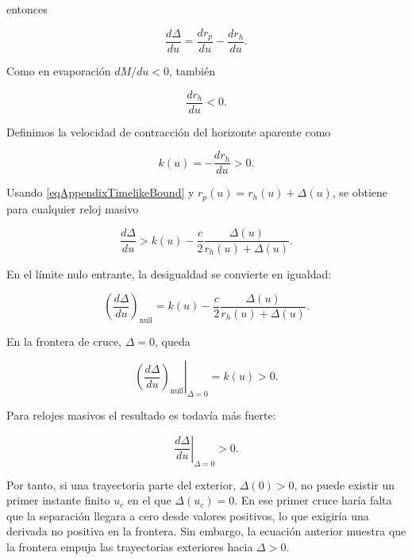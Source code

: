 \documentclass[
aps,
prd,
reprint,
superscriptaddress,
nofootinbib,
amsmath,
amssymb
]{revtex4-2}
\begin{document}
entonces

\begin{equation}
\frac{d\Delta}{du}
=
\frac{dr_p}{du}
-
\frac{dr_h}{du}.
\end{equation}

Como en evaporación $dM/du<0$, también

\begin{equation}
\frac{dr_h}{du}<0.
\end{equation}

Definimos la velocidad de contracción del horizonte aparente como

\begin{equation}
k(u)=
-
\frac{dr_h}{du}
>0.
\end{equation}

Usando \eqref{eqAppendixTimelikeBound} y $r_p(u)=r_h(u)+\Delta(u)$, se obtiene para cualquier reloj masivo

\begin{equation}
\frac{d\Delta}{du}
>
k(u)
-
\frac{c}{2}
\frac{\Delta(u)}
{r_h(u)+\Delta(u)}.
\end{equation}

En el límite nulo entrante, la desigualdad se convierte en igualdad:

\begin{equation}
\left(
\frac{d\Delta}{du}
\right)_{\mathrm{null}}
=
k(u)
-
\frac{c}{2}
\frac{\Delta(u)}
{r_h(u)+\Delta(u)}.
\end{equation}

En la frontera de cruce, $\Delta=0$, queda

\begin{equation}
\left.
\left(
\frac{d\Delta}{du}
\right)_{\mathrm{null}}
\right|_{\Delta=0}
=
k(u)>0.
\end{equation}

Para relojes masivos el resultado es todavía más fuerte:

\begin{equation}
\left.
\frac{d\Delta}{du}
\right|_{\Delta=0}
>0.
\end{equation}

Por tanto, si una trayectoria parte del exterior, $\Delta(0)>0$, no puede existir un primer instante finito $u_c$ en el que $\Delta(u_c)=0$. En ese primer cruce haría falta que la separación llegara a cero desde valores positivos, lo que exigiría una derivada no positiva en la frontera. Sin embargo, la ecuación anterior muestra que la frontera empuja las trayectorias exteriores hacia $\Delta>0$.



\end{document}
